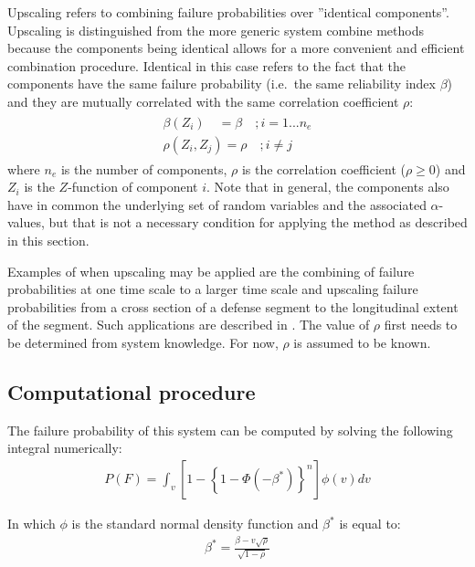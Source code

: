 {Upscaling refers to combining failure probabilities over ''identical components''.
Upscaling is distinguished from the more generic system combine methods because the components being identical allows for a more convenient and efficient combination procedure.
Identical in this case refers to the fact that the components have the same failure probability (i.e.\ the same reliability index $\beta $) and they are mutually correlated with the same correlation coefficient $\rho$: 
\begin{align}
\begin{array}{l} {\beta \left(Z_{i} \right)\quad    =\beta \quad ;i=1...n_{e} } \\ {\rho \left(Z_{i} ,Z_{j} \right)=\rho \quad ;i\ne j} \end{array}\label{ZEqnNum897176} 
\end{align}
where $n_e$ is the number of components, $\rho$ is the correlation coefficient ($\rho \geqslant 0$) and $Z_i$ is the $Z$-function of component $i$.
Note that in general, the components also have in common the underlying set of random variables and the associated $\alpha$-values, but that is not a necessary condition for applying the method as described in this section.

Examples of when upscaling may be applied are the combining of failure probabilities at one time scale to a larger time scale  and upscaling failure probabilities from a cross section of a defense segment to the longitudinal extent of the segment.
Such applications are described in .
The value of $\rho$ first needs to be determined from system knowledge.
For now, $\rho$ is assumed to be known.

\subsection{Computational procedure}\label{Section_2.4.3.1}

The failure probability of this system can be computed by solving the following integral numerically:
\begin{align}
P(F)=\int _{v}^{}\left[1-\left\{1-\Phi \left(-\beta^{*}\right)\right\}^{n} \right]\phi (v)dv  \label{0.145)} 
\end{align}

In which $\phi$ is the standard normal density function and $\beta^{*}$ is equal to:
\begin{align}
\beta ^{*} =\frac{\beta -v\sqrt{\rho } }{\sqrt{1-\rho } } \label{0.144)} 
\end{align}

}
